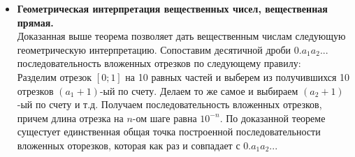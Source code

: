 \documentclass[12pt,a4paper]{article}
\begin{document}
\begin{itemize}
\item \textbf{Геометрическая интерпретация вещественных чисел, вещественная прямая.} \\
Доказанная выше теорема позволяет дать вещественным числам следующую геометрическую интерпретацию. Сопоставим десятичной дроби $0.a_1a_2...$ последовательность вложенных отрезков по следующему правилу: \\
Разделим отрезок $[0;1]$ на 10 равных частей и выберем из получившихся 10 отрезков $(a_1 + 1)$-ый по счету. Делаем то же самое и выбираем $(a_2 + 1)$-ый по счету и т.д. Получаем последовательность вложенных отрезков, причем длина отрезка на $n$-ом шаге равна $10^{-n}$. По доказанной теореме сущестует единственная общая точка построенной последовательности вложенных оторезков, которая как раз и совпадает с $0.a_1a_2...$
\end{itemize}
\end{document}
